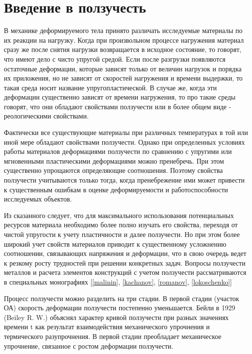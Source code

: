\section{Введение в ползучесть}
В механике деформируемого тела принято различать исследуемые материалы по их 
реакции на нагрузку. Когда при произвольном процессе нагружения материал сразу же после
снятия нагрузки возвращается в исходное состояние, то говорят, что имеют дело с чисто 
упругой средой. Если после разгрузки появляются остаточные деформации, которые зависят
только от величин нагрузок и порядка их приложения, но не зависят от
скоростей нагружения и времени выдержки, то такая среда носит название 
упругопластической.
В случае же, когда эти деформации существенно зависят от времени нагружения, то про такие 
среды говорят, что они обладают свойствами ползучести или в более общем виде - реологическими
свойствами.

Фактически все существующие материалы при различных температурах в той или иной мере 
обладают свойствами ползучести. Однако при определенных условиях работы материалов 
деформациями ползучести по сравнению с упругими или мгновенными пластическими 
деформациями можно пренебречь. При этом существенно упрощаются определяющие соотношения. 
Поэтому свойства ползучести учитываются только тогда, когда пренебрежение ими может 
привести к существенным ошибкам в оценке деформируемости и работоспособности исследуемых 
объектов.

Из сказанного следует, что для максимального использования потенциальных ресурсов 
материала необходимо более полно изучать его свойства, переходя от чистой упругости к 
учету пластичности и далее ползучести. Но при этом более широкий учет свойств материалов 
приводит к существенному усложнению соотношении, связывающих напряжения и деформации, что 
в свою очередь ведет к резкому росту трудностей при решении конкретных задач.
Вопросы ползучести металлов и расчета элементов конструкций с учетом ползучести 
рассматриваются в специальных монографиях [\ref{malinin}, \ref{kachanov}, \ref{romanov}, \ref{lokoschenko}]

Процесс ползучести можно разделить на три стадии. В первой стадии (участок 	
ОА) скорость деформации ползучести постепенно уменьшается. Бейли в 1929 
(Beiley R. W.) объяснял характер кривой ползучести при разных значениях 
времени t как результат взаимодействия механического упрочнения и 
термического разупрочнения. В первой стадии преобладает механическое 
упрочнение, связанное с ростом деформации ползучести.
			
